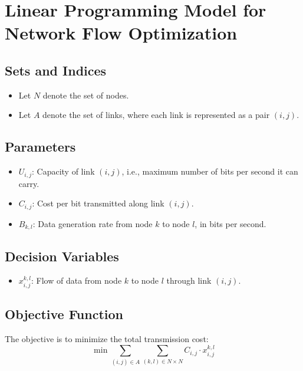 \documentclass{article}
\begin{document}
\section*{Linear Programming Model for Network Flow Optimization}

\subsection*{Sets and Indices}
\begin{itemize}
    \item Let \( N \) denote the set of nodes.
    \item Let \( A \) denote the set of links, where each link is represented as a pair \((i, j)\).
\end{itemize}

\subsection*{Parameters}
\begin{itemize}
    \item \( U_{i,j} \): Capacity of link \((i, j)\), i.e., maximum number of bits per second it can carry.
    \item \( C_{i,j} \): Cost per bit transmitted along link \((i, j)\).
    \item \( B_{k,l} \): Data generation rate from node \(k\) to node \(l\), in bits per second.
\end{itemize}

\subsection*{Decision Variables}
\begin{itemize}
    \item \( x_{i,j}^{k,l} \): Flow of data from node \(k\) to node \(l\) through link \((i, j)\).
\end{itemize}

\subsection*{Objective Function}
The objective is to minimize the total transmission cost:
\[
\min \sum_{(i,j) \in A} \sum_{(k,l) \in N \times N} C_{i,j} \cdot x_{i,j}^{k,l}
\]
\end{document}
